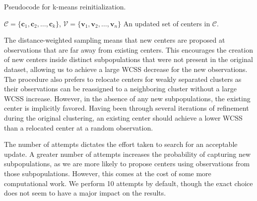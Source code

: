\documentclass{article}
\begin{document}
\begin{algorithm}
\caption{Pseudocode for k-means reinitialization.}
\begin{algorithmic} 
\REQUIRE $\mathcal{C} = \{\mathbf{c}_1, \mathbf{c}_2, \ldots, \mathbf{c}_k \}$, $\mathcal{V} = \{\mathbf{v}_1, \mathbf{v}_2, \ldots, \mathbf{v}_n \}$
\ENSURE An updated set of centers in $\mathcal{C}$.
\ENDFOR
\end{algorithmic}
\label{algo:main}
\end{algorithm}

The distance-weighted sampling means that new centers are proposed at observations that are far away from existing centers.
This encourages the creation of new centers inside distinct subpopulations that were not present in the original dataset, allowing us to achieve a large WCSS decrease for the new observations.
The procedure also prefers to relocate centers for weakly separated clusters as their observations can be reassigned to a neighboring cluster without a large WCSS increase.
However, in the absence of any new subpopulations, the existing center is implicitly favored.
Having been through several iterations of refinement during the original clustering, an existing center should achieve a lower WCSS than a relocated center at a random observation.

The number of attempts dictates the effort taken to search for an acceptable update.
A greater number of attempts increases the probability of capturing new subpopulations, as we are more likely to propose centers using observations from those subpopulations.
However, this comes at the cost of some more computational work.
We perform 10 attempts by default, though the exact choice does not seem to have a major impact on the results.
\end{document}

